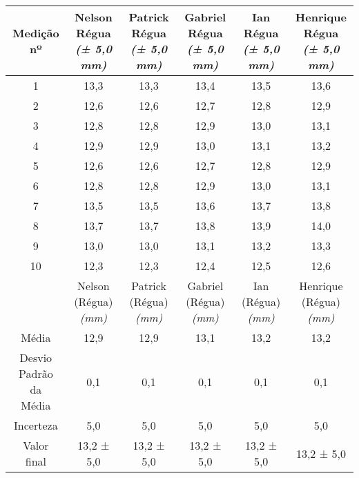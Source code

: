 \documentclass{article}
\begin{document}
\begin{table}[h!]
\centering
\begin{tabular}{c c c c c c }
\toprule
Medição nº & \shortstack{Nelson\\Régua\\\textit{(± 5,0 mm)}} & \shortstack{Patrick\\Régua\\\textit{(± 5,0 mm)}} & \shortstack{Gabriel\\Régua\\\textit{(± 5,0 mm)}} & \shortstack{Ian\\Régua\\\textit{(± 5,0 mm)}} & \shortstack{Henrique\\Régua\\\textit{(± 5,0 mm)}}\\
\midrule
1 & 13,3 & 13,3 & 13,4 & 13,5 & 13,6\\
2 & 12,6 & 12,6 & 12,7 & 12,8 & 12,9\\
3 & 12,8 & 12,8 & 12,9 & 13,0 & 13,1\\
4 & 12,9 & 12,9 & 13,0 & 13,1 & 13,2\\
5 & 12,6 & 12,6 & 12,7 & 12,8 & 12,9\\
6 & 12,8 & 12,8 & 12,9 & 13,0 & 13,1\\
7 & 13,5 & 13,5 & 13,6 & 13,7 & 13,8\\
8 & 13,7 & 13,7 & 13,8 & 13,9 & 14,0\\
9 & 13,0 & 13,0 & 13,1 & 13,2 & 13,3\\
10 & 12,3 & 12,3 & 12,4 & 12,5 & 12,6\\
\midrule
&\shortstack{Nelson\\(Régua)\\\textit{(mm)}} & \shortstack{Patrick\\(Régua)\\\textit{(mm)}} & \shortstack{Gabriel\\(Régua)\\\textit{(mm)}} & \shortstack{Ian\\(Régua)\\\textit{(mm)}} & \shortstack{Henrique\\(Régua)\\\textit{(mm)}}\\
\midrule
Média & 12,9 & 12,9 & 13,1 & 13,2 & 13,2\\[3pt]
\shortstack{Desvio\\Padrão da\\Média} & 0,1 & 0,1 & 0,1 & 0,1 & 0,1\\[3pt]
Incerteza & 5,0 & 5,0 & 5,0 & 5,0 & 5,0\\[3pt]
Valor final & 13,2 ± 5,0 & 13,2 ± 5,0 & 13,2 ± 5,0 & 13,2 ± 5,0 & 13,2 ± 5,0\\[3pt]
\bottomrule
\end{tabular}
\end{table}
\end{document}

